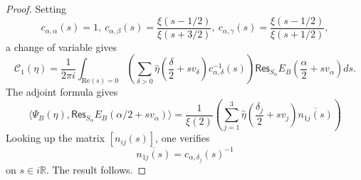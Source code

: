 \documentclass[10pt,a4paper]{amsart}
\begin{document}
\begin{proof}
Setting 
\[
c_{\alpha,\alpha}(s)=1,\ c_{\alpha,\beta}(s)=\frac{\xi(s-1/2)}{\xi(s+3/2)},\ c_{\alpha,\gamma}(s)=\frac{\xi(s-1/2)}{\xi(s+1/2)},
\]
a change of variable gives 
\[
\mathcal{C}_{1}(\eta)=\frac{1}{2\pi i}\int_{\text{Re}(s)=0}\left(\sum_{\delta>0}\widehat{\eta}\left(\frac{\delta}{2}+sv_{\delta}\right)c_{\alpha,\delta}^{-1}(s)\right)\mathsf{Res}_{S_{\alpha}}E_{B}\left(\frac{\alpha}{2}+sv_{\alpha}\right)ds.
\]
The adjoint formula gives
\[
\langle\Psi_{B}(\eta),\mathsf{Res}_{S_{\alpha}}E_{B}\left(\alpha/2+sv_{\alpha}\right)\rangle=\frac{1}{\xi(2)}\left(\sum_{j=1}^{3}\widehat{\eta}\left(\frac{\delta_{j}}{2}+sv_{j}\right)\overline{n_{1j}(s)}\right)
\]
Looking up the matrix $[n_{ij}(s)]$, one verifies 
\[
\overline{n_{1j}(s)}=c_{\alpha,\delta_{j}}(s)^{-1}
\]
on $s\in i\mathbb{R}$. The result follows. 
\end{proof}
\end{document}
